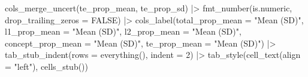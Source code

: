 \documentclass[
  letterpaper,
  DIV=11,
  numbers=noendperiod]{scrartcl}
\newenvironment{Shaded}{\begin{snugshade}}{\end{snugshade}}
\newcommand{\AttributeTok}[1]{\textcolor[rgb]{0.40,0.45,0.13}{#1}}
\newcommand{\ConstantTok}[1]{\textcolor[rgb]{0.56,0.35,0.01}{#1}}
\newcommand{\DecValTok}[1]{\textcolor[rgb]{0.68,0.00,0.00}{#1}}
\newcommand{\FunctionTok}[1]{\textcolor[rgb]{0.28,0.35,0.67}{#1}}
\newcommand{\NormalTok}[1]{\textcolor[rgb]{0.00,0.23,0.31}{#1}}
\newcommand{\SpecialCharTok}[1]{\textcolor[rgb]{0.37,0.37,0.37}{#1}}
\newcommand{\StringTok}[1]{\textcolor[rgb]{0.13,0.47,0.30}{#1}}
\begin{document}
\begin{Shaded}
\begin{Highlighting}[]
    \FunctionTok{cols\_merge\_uncert}\NormalTok{(te\_prop\_mean, te\_prop\_sd) }\SpecialCharTok{|\textgreater{}} 
    \FunctionTok{fmt\_number}\NormalTok{(is.numeric, }
               \AttributeTok{drop\_trailing\_zeros =} \ConstantTok{FALSE}\NormalTok{) }\SpecialCharTok{|\textgreater{}} 
    \FunctionTok{cols\_label}\NormalTok{(}\AttributeTok{total\_prop\_mean =} \StringTok{"Mean (SD)"}\NormalTok{,}
               \AttributeTok{l1\_prop\_mean =} \StringTok{"Mean (SD)"}\NormalTok{,}
               \AttributeTok{l2\_prop\_mean =} \StringTok{"Mean (SD)"}\NormalTok{,}
               \AttributeTok{concept\_prop\_mean =} \StringTok{"Mean (SD)"}\NormalTok{,}
               \AttributeTok{te\_prop\_mean =} \StringTok{"Mean (SD)"}\NormalTok{) }\SpecialCharTok{|\textgreater{}} 
    \FunctionTok{tab\_stub\_indent}\NormalTok{(}\AttributeTok{rows =} \FunctionTok{everything}\NormalTok{(),}
                    \AttributeTok{indent =} \DecValTok{2}\NormalTok{) }\SpecialCharTok{|\textgreater{}} 
    \FunctionTok{tab\_style}\NormalTok{(}\FunctionTok{cell\_text}\NormalTok{(}\AttributeTok{align =} \StringTok{"left"}\NormalTok{),}
              \FunctionTok{cells\_stub}\NormalTok{())}
\end{Highlighting}
\end{Shaded}
\end{document}
